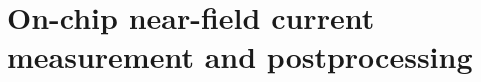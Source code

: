 \section{On-chip near-field current measurement and postprocessing}
\label{sec:on-chip-near-field-process}
